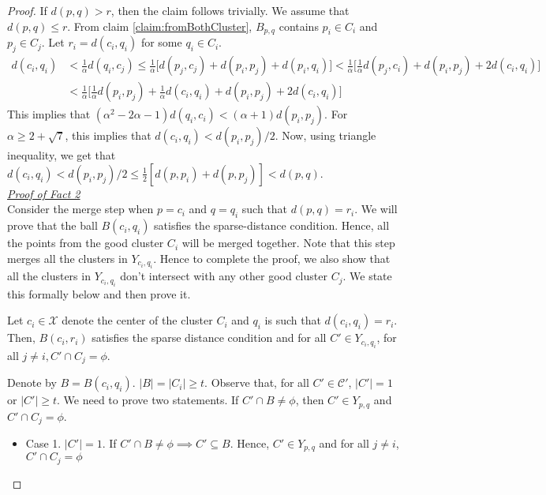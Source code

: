 \documentclass[11pt]{article}
\newcommand{\mc}{\mathcal}
\begin{document}
\begin{proof}
\vspace{-0.1in} If $d(p, q) > r$, then the claim follows trivially. We assume that $d(p, q) \le r$. From claim \ref{claim:fromBothCluster}, $B_{p, q}$ contains $p_i \in C_i$ and $p_j \in C_j$. Let $r_i = d(c_i, q_i)$ for some $q_i \in C_i$.
\begin{align*}
d(c_i, q_i) &< \frac{1}{\alpha} d(q_i, c_j) \le \frac{1}{\alpha} \bigg[ d(p_j, c_j) + d(p_i, p_j) + d(p_i, q_i)\bigg] < \frac{1}{\alpha} \bigg[ \frac{1}{\alpha}d(p_j, c_i) + d(p_i, p_j) + 2d(c_i, q_i)\bigg]\\
& < \frac{1}{\alpha} \bigg[ \frac{1}{\alpha}d(p_i, p_j) + \frac{1}{\alpha}d(c_i, q_i) + d(p_i, p_j) + 2d(c_i, q_i)\bigg]
\end{align*}
This implies that $(\alpha^2 - 2\alpha - 1)d(q_i, c_i) < (\alpha + 1) d(p_i, p_j)$. For $\alpha \ge 2 + \sqrt 7$, this implies that $d(c_i, q_i) < d(p_i, p_j)/2$. Now, using triangle inequality, we get that $d(c_i, q_i) < d(p_i, p_j)/2 \le \frac{1}{2}[d(p, p_i) + d(p, p_j)] < d(p, q)$.\\

\noindent\textit{\underline{Proof of Fact 2}}\\
Consider the merge step when $p = c_i$ and $q = q_i$ such that $d(p, q) = r_i$. We will prove that the ball $B(c_i, q_i)$ satisfies the sparse-distance condition. Hence, all the points from the good cluster $C_i$ will be merged together. Note that this step merges all the clusters in $Y_{c_i, q_i}$. Hence to complete the proof, we also show that all the clusters in $Y_{c_i, q_i}$ don't intersect with any other good cluster $C_j$. We state this formally below and then prove it.

\begin{claim}
\label{claim:dciqi}
Let $c_i \in \mc X$ denote the center of the cluster $C_i$ and $q_i$ is such that $d(c_i, q_i) = r_i$. Then, $B(c_i, r_i)$ satisfies the sparse distance condition and for all $C' \in Y_{c_i, q_i}$, for all $j \neq i, C' \cap C_j = \phi$.
\end{claim}

\vspace{-0.1in} Denote by $B = B(c_i, q_i)$. $|B| = |C_i| \ge t$. Observe that, for all $C' \in \mc C'$, $|C'| = 1$ or $|C'| \ge t$. We need to prove two statements. If $C' \cap B \neq \phi$, then $C' \in Y_{p,q}$ and $C' \cap C_j = \phi$. 

\begin{itemize}[nolistsep]
\item Case 1. $|C'| = 1$. If $C' \cap B \neq \phi \implies C' \subseteq B$. Hence, $C' \in Y_{p,q}$ and for all $j \neq i$, $C' \cap C_j = \phi$


\end{itemize}
\end{proof}
\end{document}
